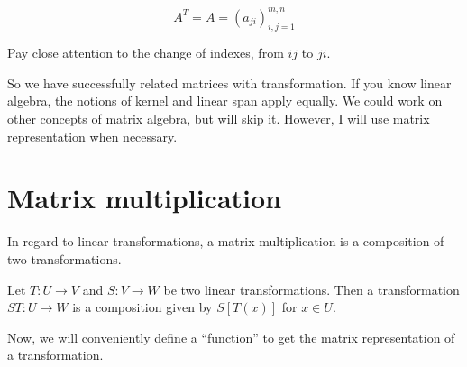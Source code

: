 \documentclass[../linear-spaces.tex]{subfiles}
\begin{document}
\begin{equation}
    A^{T} = A=\left(a_{ji}\right)^{m,n}_{i,j=1}
\end{equation}

Pay close attention to the change of indexes, from $ij$ to $ji$.

So we have successfully related matrices with transformation. If you know
linear algebra, the notions of kernel and linear span apply equally. We could
work on other concepts of matrix algebra, but will skip it. However, I will use
matrix representation when necessary.

\section{Matrix multiplication}

In regard to linear transformations, a matrix multiplication is a composition
of two transformations.

\begin{definition}
    Let $T: U \to V$ and $S: V \to W$ be two linear transformations. Then a transformation
    $ST : U \to W$ is a composition given by $S\left[T(x)\right]$ for $x\in U$.
\end{definition}
Now, we will conveniently define a ``function'' to get the matrix representation of a transformation.
\end{document}

